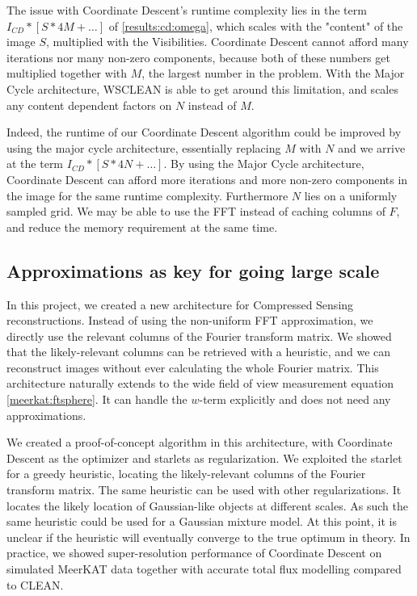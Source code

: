 The issue with Coordinate Descent's runtime complexity lies in the term $I_{CD} * [S * 4M +\ldots]$ of \eqref{results:cd:omega}, which scales with the "content" of the image $S$, multiplied with the Visibilities. Coordinate Descent cannot afford many iterations nor many non-zero components, because both of these numbers get multiplied together with $M$, the largest number in the problem. With the Major Cycle architecture, WSCLEAN is able to get around this limitation, and scales any content dependent factors on $N$ instead of $M$. 

Indeed, the runtime of our Coordinate Descent algorithm could be improved by using the major cycle architecture, essentially replacing $M$ with $N$ and we arrive at the term $I_{CD} * [S * 4N +\ldots]$. By using the Major Cycle architecture, Coordinate Descent can afford more iterations and more non-zero components in the image for the same runtime complexity. Furthermore $N$ lies on a uniformly sampled grid. We may be able to use the FFT instead of caching columns of $F$, and reduce the memory requirement at the same time.


\subsection{Approximations as key for going large scale}
In this project, we created a new architecture for Compressed Sensing reconstructions. Instead of using the non-uniform FFT approximation, we directly use the relevant columns of the Fourier transform matrix. We showed that the likely-relevant columns can be retrieved with a heuristic, and we can reconstruct images without ever calculating the whole Fourier matrix. This architecture naturally extends to the wide field of view measurement equation \eqref{meerkat:ftsphere}. It can handle the $w$-term explicitly and does not need any approximations. 

We created a proof-of-concept algorithm in this architecture, with Coordinate Descent as the optimizer and starlets as regularization. We exploited the starlet for a greedy heuristic, locating the likely-relevant columns of the Fourier transform matrix. The same heuristic can be used with other regularizations. It locates the likely location of Gaussian-like objects at different scales. As such the same heuristic could be used for a Gaussian mixture model. At this point, it is unclear if the heuristic will eventually converge to the true optimum in theory. In practice, we showed super-resolution performance of Coordinate Descent on simulated MeerKAT data together with accurate total flux modelling compared to CLEAN. 

